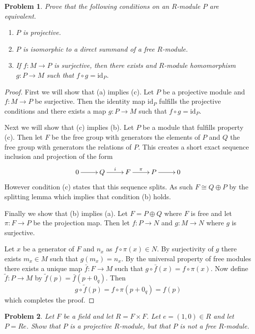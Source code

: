 \documentclass[10pt]{article}
\newcommand{\sk}{\vskip 10mm}
\newcommand{\id}{\mathrm{id}}
\theoremstyle{plain}
\newtheorem{problem}{Problem}
\theoremstyle{remark}
\begin{document}
\begin{problem}
  Prove that the following conditions on an $R$-module $P$ are equivalent.
  \begin{enumerate}
  \item[(a)] $P$ is projective.
  \item[(b)] $P$ is isomorphic to a direct summand of a free $R$-module.
  \item[(c)] If $f:M\rightarrow P$ is surjective, then there exists and
    $R$-module homomorphism $g:P\rightarrow M$ such that $f\circ g=\id_P$.
  \end{enumerate}
\end{problem}

\begin{proof}
  First we will show that (a) implies (c).
  Let $P$ be a projective module and $f:M\rightarrow P$ be surjective. Then
  the identity map $\id_P$ fulfills the projective conditions and
  there exists a map $g:P\rightarrow M$ such that $f\circ g = \id_P$.

  Next we will show that (c) implies (b). Let $P$ be a module
  that fulfills property (c). Then let $F$ be the free group
  with generators the elements of $P$ and $Q$ the free group
  with generators the relations of $P$. This creates a short
  exact sequence inclusion and projection of the form
  \[
    \xymatrix{
      0 \ar[r] & Q \ar[r]^i & F \ar[r]^\pi & P \ar[r] & 0
    }
  \]
  However condition (c) states that this sequence splits.
  As such $F\cong Q\oplus P$ by the splitting lemma which implies that
  condition (b) holds.

  Finally we show that (b) implies (a). Let $F=P\oplus Q$ where $F$
  is free and let $\pi:F\rightarrow P$ be the projection map. Then let
  $f:P\rightarrow N$ and $g:M\rightarrow N$ where $g$ is surjective.

  Let $x$ be a generator of $F$ and $n_x$ as $f\circ\pi(x)\in N$. By surjectivity
  of $g$ there exists $m_x\in M$ such that $g(m_x)=n_x$. By the universal
  property of free modules there exists a unique map $\bar{f}:F\rightarrow M$ such
  that $g\circ\bar{f}(x)=f\circ\pi(x)$. Now define $\tilde{f}:P\rightarrow M$ by $\tilde{f}(p)=\bar{f}(p+0_q)$.
  Then
  \[
    g\circ\tilde{f}(p)=f\circ\pi(p+0_q)=f(p)
  \]
  which completes the proof.
\end{proof}

\sk

\begin{problem}
  Let $F$ be a field and let $R=F\times F$. Let $e=(1,0)\in R$ and let  $P=Re$.
  Show that $P$ is a projective $R$-module, but that $P$ is not a
  free $R$-module.
\end{problem}
\end{document}
